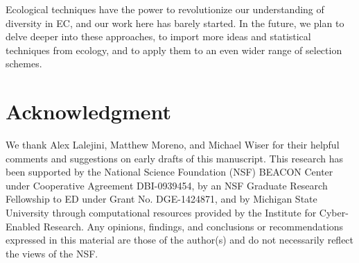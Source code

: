 Ecological techniques have the power to revolutionize our understanding of diversity in EC, and our work here has barely %
started. In the future, we plan to delve deeper into these approaches, to import more ideas and statistical techniques from ecology, and to apply them to an even wider range of selection schemes.

\section*{Acknowledgment}
We thank Alex Lalejini, Matthew Moreno, and Michael Wiser for their helpful comments and suggestions on early drafts of this manuscript. This research has been supported by the National Science Foundation (NSF) BEACON Center under Cooperative Agreement DBI-0939454, by an NSF Graduate Research Fellowship to ED under Grant No. DGE-1424871, and by Michigan State University through computational resources provided by the Institute for Cyber-Enabled Research. Any opinions, findings, and conclusions or recommendations expressed in this material are those of the author(s) and do not necessarily reflect the views of the NSF.






